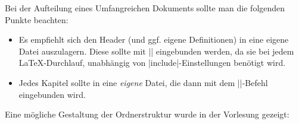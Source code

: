 % 


Bei der Aufteilung eines Umfangreichen Dokuments sollte man die folgenden Punkte beachten:
\begin{itemize}
	\item Es empfiehlt sich den Header (und ggf. eigene Definitionen) in eine eigene Datei auszulagern. Diese 
	sollte mit || eingebunden werden, da sie bei jedem \LaTeX-Durchlauf, unabhängig von 
	|include|-Einstellungen benötigt wird.
	\item Jedes Kapitel sollte in eine \emph{eigene} Datei, die dann mit dem ||-Befehl eingebunden wird.
\end{itemize}

Eine mögliche Gestaltung der Ordnerstruktur wurde in der Vorlesung gezeigt:

\begin{center}
\end{center}

\clearpage